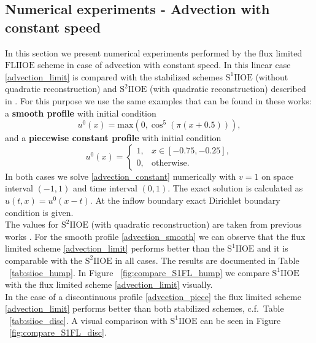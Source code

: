\documentclass[../include.tex]{subfiles}
\begin{document}
\subsection{Numerical experiments - Advection with constant speed}
In this section we present numerical experiments performed by the flux limited $ \mathrm{FLIIOE} $ scheme in case of advection with constant speed. In this linear case \eqref{advection_limit} is compared with the stabilized schemes $ \mathrm{S^1IIOE} $ (without quadratic reconstruction) and $ \mathrm{S^2IIOE} $ (with quadratic reconstruction) described in \cite{iioe2012,iioe2}. For this purpose we use the same examples that can be found in these works: a \textbf{smooth profile} with initial condition 
\begin{equation}
	\label{advection_smooth}
u^0(x) = \mathrm{max}(0, \cos^5(\pi(x+0.5))),
\end{equation}
and a \textbf{piecewise constant profile} with initial condition
\begin{equation}
	\label{advection_piece}
	u^0(x) =
	\begin{cases}
		1, &x\in[-0.75, -0.25],\nonumber\\
		0, &\textrm{otherwise}.\nonumber
	\end{cases}
\end{equation}
In both cases we solve \eqref{advection_constant} numerically with $ v = 1 $ on space interval $ (-1,1) $ and time interval $ (0,1) $. The exact solution is calculated as $ u(t, x) = u^0(x - t) $. At the inflow boundary exact Dirichlet boundary condition is given.\\
The values for $ \mathrm{S^2IIOE} $ (with quadratic reconstruction) are taken from previous works \cite{iioe1,iioe2}. 
For the smooth profile \eqref{advection_smooth} we can observe that the flux limited scheme \eqref{advection_limit} performs better than the $ \mathrm{S^1IIOE} $ and it is comparable with the $ \mathrm{S^2IIOE} $ in all cases. The results are documented in Table ~\ref{tab:siioe_hump}. In Figure  ~\ref{fig:compare_S1FL_hump} we compare $ \mathrm{S^1IIOE} $ with the flux limited scheme \eqref{advection_limit} visually.\\
In the case of a discontinuous profile \eqref{advection_piece} the flux limited scheme \eqref{advection_limit} performs better than both stabilized schemes, c.f.\ Table  ~\ref{tab:siioe_disc}. A visual comparison with $ \mathrm{S^1 IIOE} $ can be seen in Figure ~\ref{fig:compare_S1FL_disc}.
\end{document}
